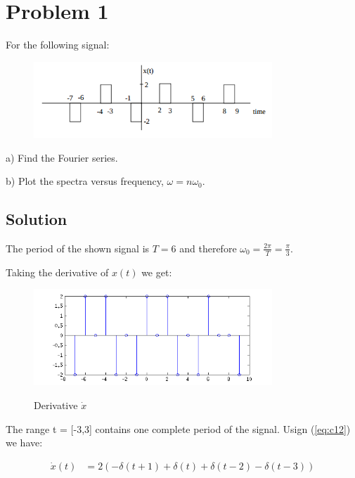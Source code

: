 \section*{Problem 1}
For the following signal:

\begin{figure}[H]
\caption*{}
\centering
\includegraphics[width=0.8\textwidth]{figs/c1p1.png}
\label{fig:}
\end{figure} 

a) Find the Fourier series.

b) Plot the spectra versus frequency, $\omega = n \omega_0$.

\subsection*{Solution}
The period of the shown signal is $T=6$ and therefore $\omega_0 = \frac{2 \pi}{T} =  \frac{\pi}{3}$.

Taking the derivative of $x(t)$ we get:

\begin{figure}[H]
\caption{Derivative $\dot{x}$}
\centering
\includegraphics[width=0.8\textwidth]{figs/c1p1a.png}
\label{fig:}
\end{figure} 

The range t = [-3,3] contains one complete period of the signal. 
Usign (\ref{eq:c12}) we have:

\begin{equation*}
\begin{aligned}
\dot{x}(t) &= 2 (- \delta(t+1) + \delta(t) + \delta(t-2) - \delta(t-3) )\\
\end{aligned}
\end{equation*} 

